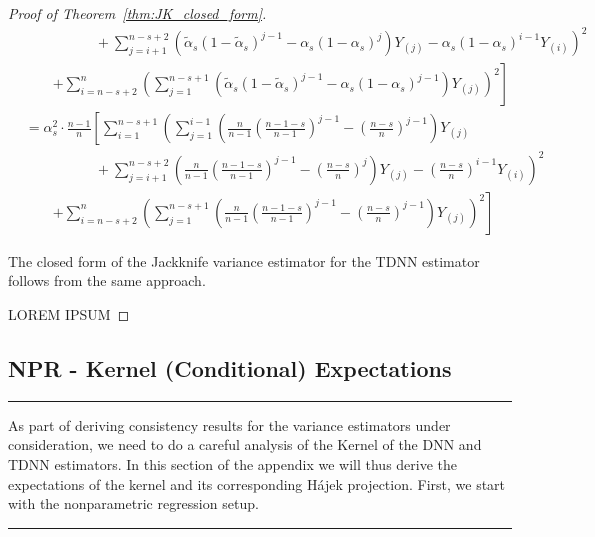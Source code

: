 \begin{proof}[Proof of Theorem~\ref{thm:JK_closed_form}]
\begin{equation}
\begin{aligned}
				& \quad \quad \quad \quad \quad +  \left.\sum_{j = i + 1}^{n - s + 2}\left(\tilde{\alpha}_{s}{\left(1 - \tilde{\alpha}_{s}\right)}^{j - 1} - \alpha_{s}{\left(1 - \alpha_{s}\right)}^{j}
				\right) Y_{(j)}
				-  \alpha_{s}{\left(1 - \alpha_{s}\right)}^{i - 1} Y_{(i)}
				\right)^2\\
				& \quad \quad \left. + \sum_{i = n - s + 2}^{n} {\left(\sum_{j = 1}^{n - s + 1} 
					\left(\tilde{\alpha}_{s}{\left(1 - \tilde{\alpha}_{s}\right)}^{j - 1} - \alpha_{s}{\left(1 - \alpha_{s}\right)}^{j - 1}
					\right) Y_{(j)}\right)}^2
				\right]\\
				& = \alpha_{s}^2 \cdot \frac{n - 1}{n} \left[
					\sum_{i = 1}^{n - s + 1} \left(
					\sum_{j = 1}^{i - 1}\left(\frac{n}{n-1}{\left(\frac{n - 1 - s}{n - 1}\right)}^{j - 1} - {\left(\frac{n - s}{n}\right)}^{j - 1}
					\right) Y_{(j)} \right. \right.\\
					& \quad \quad \quad \quad \quad +  \left.\sum_{j = i + 1}^{n - s + 2}\left(\frac{n}{n-1}{\left(\frac{n - 1 - s}{n - 1}\right)}^{j - 1} - {\left(\frac{n - s}{n}\right)}^{j}
					\right) Y_{(j)}
					-  {\left(\frac{n - s}{n}\right)}^{i - 1} Y_{(i)}
					\right)^2\\
					& \quad \quad \left. + \sum_{i = n - s + 2}^{n} {\left(\sum_{j = 1}^{n - s + 1} 
						\left(\frac{n}{n-1}{\left(\frac{n - 1 - s}{n - 1}\right)}^{j - 1} - {\left(\frac{n - s}{n}\right)}^{j - 1}
						\right) Y_{(j)}\right)}^2
					\right]
		\end{aligned}
	\end{equation}

	The closed form of the Jackknife variance estimator for the TDNN estimator follows from the same approach.

		{\color{red} LOREM IPSUM}
\end{proof}

\newpage
\subsection{NPR - Kernel (Conditional) Expectations}\label{subsec:KernelCondExp}
\hrule
As part of deriving consistency results for the variance estimators under consideration, we need to do a careful analysis of the Kernel of the DNN and TDNN estimators.
In this section of the appendix we will thus derive the expectations of the kernel and its corresponding H\'ajek projection.
First, we start with the nonparametric regression setup.
\vspace{0.5cm}
\hrule

